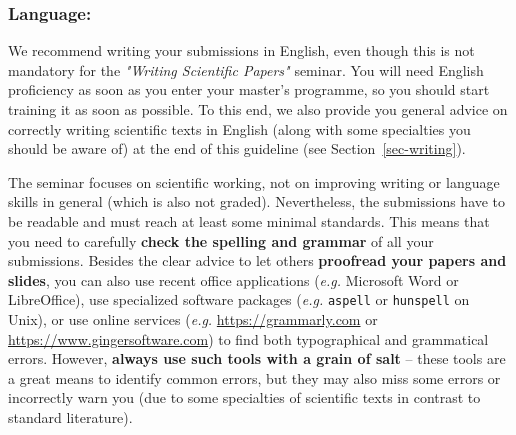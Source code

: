 \documentclass[11pt,a4paper]{article}
\begin{document}
% 


\subsubsection*{Language:}
We recommend writing your submissions in English, even though this is not mandatory for the \emph{"Writing Scientific Papers"} seminar.
You will need English proficiency as soon as you enter your master's programme, so you should start training it as soon as possible.
To this end, we also provide you general advice on correctly writing scientific texts in English (along with some specialties you should be aware of) at the end of this guideline (see Section~\ref{sec-writing}).

The seminar focuses on scientific working, not on improving writing or language skills in general (which is also not graded).
Nevertheless, the submissions have to be readable and must reach at least some minimal standards.
This means that you need to carefully \textbf{check the spelling and grammar} of all your submissions. 
Besides the clear advice to let others \textbf{proofread your papers and slides}, you can also use recent office applications (\emph{e.g.} Microsoft Word or LibreOffice), use specialized software packages (\emph{e.g.} \texttt{aspell} or \texttt{hunspell} on Unix), or use online services (\emph{e.g.} \url{https://grammarly.com} or \url{https://www.gingersoftware.com}) to find both typographical and grammatical errors.
However, \textbf{always use such tools with a grain of salt} -- these tools are a great means to identify common errors, but they may also miss some errors or incorrectly warn you (due to some specialties of scientific texts in contrast to standard literature).
\end{document}
